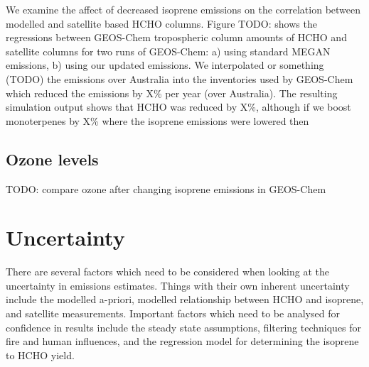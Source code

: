     We examine the affect of decreased isoprene emissions on the correlation between modelled and satellite based HCHO columns.
     Figure TODO: shows the regressions between GEOS-Chem tropospheric column amounts of HCHO and satellite columns for two runs of GEOS-Chem: a) using standard MEGAN emissions, b) using our updated emissions.
     We interpolated or something (TODO) the emissions over Australia into the inventories used by GEOS-Chem which reduced the emissions by X\% per year (over Australia).
     The resulting simulation output shows that HCHO was reduced by X\%, although if we boost monoterpenes by X\% where the isoprene emissions were lowered then 
     
   \subsection{Ozone levels}
   
     TODO: compare ozone after changing isoprene emissions in GEOS-Chem

\section{Uncertainty}
\label{BioIsop:Uncertainty}

  There are several factors which need to be considered when looking at the uncertainty in emissions estimates.
  Things with their own inherent uncertainty include the modelled a-priori, modelled relationship between HCHO and isoprene, and satellite measurements. 
  Important factors which need to be analysed for confidence in results include the steady state assumptions, filtering techniques for fire and human influences, and the regression model for determining the isoprene to HCHO yield.
  
